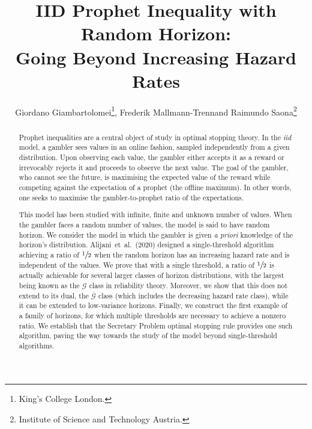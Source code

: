\documentclass[11pt, a4paper, twoside]{article}
\title{IID Prophet Inequality with Random Horizon:\\ Going Beyond Increasing Hazard Rates}
\author{Giordano Giambartolomei\setcounter{footnote}{1}\thanks{King's College London.}, Frederik Mallmann-Trenn\footnotemark[2] and Raimundo Saona\setcounter{footnote}{7}\thanks{Institute of Science and Technology Austria.}
}
\date{}
\newcommand{\PGF}{\mathcal{G}}
\newcommand{\PGFd}{\overline{\mathcal{G}}}
\numberwithin{equation}{section}
\begin{document}
        \maketitle
        \thispagestyle{empty}
        \begin{abstract}
        	Prophet inequalities are a central object of study in optimal stopping theory. In the \textit{iid} model, a gambler sees values in an online fashion, sampled independently from a given distribution. 
        	Upon observing each value, the gambler either accepts it as a reward or irrevocably rejects it and proceeds to observe the next value. The goal of the gambler, who cannot see the future, is maximising the expected value of the reward while competing against the expectation of a prophet (the offline maximum). 
        	In other words, one seeks to maximise the gambler-to-prophet ratio of the expectations. 
        	
        	This model has been studied with infinite, finite and unknown number of values. 
        	When the gambler faces a random number of values, the model is said to have random horizon. 
        	We consider the model in which the gambler is given \textit{a priori} knowledge of the horizon's distribution. 
        	Alijani~et~al.~(2020) designed a single-threshold algorithm achieving a ratio of $\sfrac{1}{2}$ when the random horizon has an increasing hazard rate and is independent of the values. 
        	We prove that with a single threshold, a ratio of $\sfrac{1}{2}$ is actually achievable for several larger classes of horizon distributions, with the largest being known as the $\PGF$ class in reliability theory. 
        	Moreover, we show that this does not extend to its dual, the $\PGFd$ class (which includes the decreasing hazard rate class), while it can be extended to low-variance horizons. 
        	Finally, we construct the first example of a family of horizons, for which multiple thresholds are necessary to achieve a nonzero ratio. We establish that the Secretary Problem optimal stopping rule provides one such algorithm, paving the way towards the study of the model beyond single-threshold algorithms.
        \end{abstract}
\clearpage
         \thispagestyle{empty}
        \setcounter{tocdepth}{1} \tableofcontents
       \clearpage
    \setcounter{footnote}{0}
\end{document}
